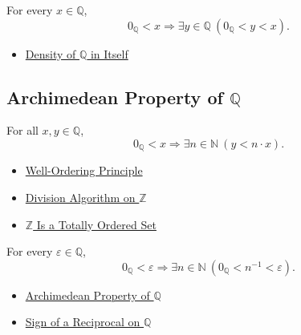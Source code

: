 \begin{proposition}
\label{prop:no-least-positive-rational}
For every $x\in\mathbb{Q}$,
\[
0_{\mathbb{Q}}<x
\Longrightarrow
\exists y\in\mathbb{Q}\ (0_{\mathbb{Q}}<y<x).
\]
\end{proposition}

\begin{dependencies}
\begin{itemize}
  \item \hyperref[thm:density-of-q]{Density of $\mathbb{Q}$ in Itself}
\end{itemize}
\end{dependencies}

\subsection*{Archimedean Property of $\mathbb{Q}$}

\begin{theorem}
\label{thm:archimedean-property-of-q}
For all $x,y\in\mathbb{Q}$,
\[
0_{\mathbb{Q}}<x
\Longrightarrow
\exists n\in\mathbb{N}\ (y<n\cdot x).
\]
\end{theorem}

\begin{dependencies}
\begin{itemize}
  \item \hyperref[thm:well-ordering-principle]{Well-Ordering Principle}
  \item \hyperref[thm:division-algorithm-on-z]{Division Algorithm on $\mathbb{Z}$}
  \item \hyperref[thm:z-totally-ordered-set]{$\mathbb{Z}$ Is a Totally Ordered Set}
\end{itemize}
\end{dependencies}

\begin{corollary}
\label{cor:reciprocals-arbitrarily-small-q}
For every $\varepsilon\in\mathbb{Q}$,
\[
0_{\mathbb{Q}}<\varepsilon
\Longrightarrow
\exists n\in\mathbb{N}\ 
\left(0_{\mathbb{Q}}<n^{-1}<\varepsilon\right).
\]
\end{corollary}

\begin{dependencies}
\begin{itemize}
  \item \hyperref[thm:archimedean-property-of-q]{Archimedean Property of $\mathbb{Q}$}
  \item \hyperref[thm:sign-of-reciprocal-q]{Sign of a Reciprocal on $\mathbb{Q}$}
\end{itemize}
\end{dependencies}
